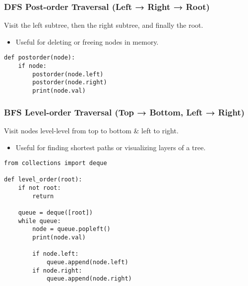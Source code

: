 \subsubsection{DFS Post-order Traversal (Left → Right → Root)}
\begin{definition}
    Visit the left subtree, then the right subtree, and finally the root.
    \begin{itemize}
        \item Useful for deleting or freeing nodes in memory.
    \end{itemize}
\end{definition}

\begin{algo}
\begin{lstlisting}
def postorder(node):
    if node:
        postorder(node.left)
        postorder(node.right)
        print(node.val)
\end{lstlisting}
\end{algo}

\subsubsection{BFS Level-order Traversal (Top → Bottom, Left → Right)}
\begin{definition}
    Visit nodes level-level from top to bottom \& left to right.
    \begin{itemize}
        \item Useful for finding shortest paths or visualizing layers of a tree.
    \end{itemize}
\end{definition}

\begin{algo}
\begin{lstlisting}
from collections import deque

def level_order(root):
    if not root:
        return

    queue = deque([root])
    while queue:
        node = queue.popleft()
        print(node.val)

        if node.left:
            queue.append(node.left)
        if node.right:
            queue.append(node.right)
\end{lstlisting}
\end{algo}
\newpage

